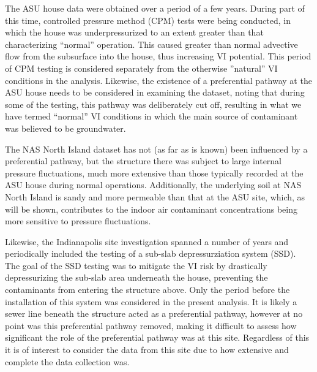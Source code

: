\documentclass[journal=esthag,manuscript=article]{achemso}
\begin{document}
The ASU house data were obtained over a period of a few years.
During part of this time, controlled pressure method (CPM) tests were being conducted, in which the house was underpressurized to an extent greater than that characterizing “normal” operation.
This caused greater than normal advective flow from the subsurface into the house, thus increasing VI potential\cite{mchugh_evaluation_2012,mchugh_recent_2017,holton_evaluation_2015}.
This period of CPM testing is considered separately from the otherwise ”natural” VI conditions in the analysis.
Likewise, the existence of a preferential pathway at the ASU house needs to be considered in examining the dataset, noting that during some of the testing, this pathway was deliberately cut off, resulting in what we have termed “normal” VI conditions in which the main source of contaminant was believed to be groundwater. \par

The NAS North Island dataset has not (as far as is known) been influenced by a preferential pathway, but the structure there was subject to large internal pressure fluctuations, much more extensive than those typically recorded at the ASU house during normal operations.
Additionally, the underlying soil at NAS North Island is sandy and more permeable than that at the ASU site, which, as will be shown, contributes to the indoor air contaminant concentrations being more sensitive to pressure fluctuations\cite{hosangadi_high-frequency_2017}. \par

Likewise, the Indianapolis site investigation spanned a number of years and periodically included the testing of a sub-slab depressurziation system (SSD).
The goal of the SSD testing was to mitigate the VI risk by drastically depressurizing the sub-slab area underneath the house, preventing the contaminants from entering the structure above.
Only the period before the installation of this system was considered in the present analysis.
It is likely a sewer line beneath the structure acted as a preferential pathway\cite{mchugh_evidence_2017}, however at no point was this preferential pathway removed, making it difficult to assess how significant the role of the preferential pathway was at this site.
Regardless of this it is of interest to consider the data from this site due to how extensive and complete the data collection was. \par
\end{document}

